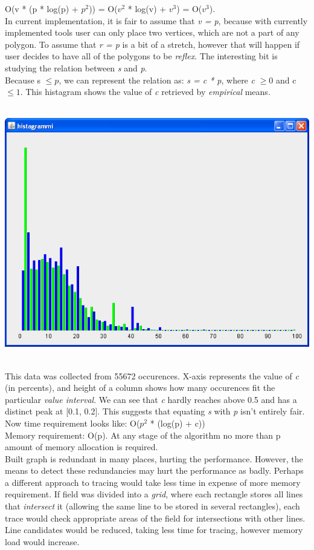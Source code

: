 \documentclass[a4paper,12pt]{article}
\begin{document}
O(v * (p * log(p) + $p^{2}$)) = O($v^{2}$ * log(v) + $v^{3}$) = O($v^{3}$).\\
In current implementation, it is fair to assume that \emph{v = p}, because with currently implemented tools user can only place two vertices, which are not a part of any polygon. To assume that \emph{r = p} is a bit of a stretch, however that will happen if user decides to have all of the polygons to be \emph{reflex}. The interesting bit is studying the relation between \emph{s} and \emph{p}.\\
Because s $\leq{p}$, we can represent the relation as: \emph{s = c * p}, where \emph{c} $\geq{0}$ and c $\leq{1}$. This histagram shows the value of \emph{c} retrieved by \emph{empirical} means.\\ \\
\centerline{\includegraphics[scale=0.5]{histagram.png}} \hspace*{\fill} \\
This data was collected from 55672 occurences. X-axis represents the value of \emph{c} (in percents), and height of a column shows how many occurences fit the particular \emph{value interval}. We can see that \emph{c} hardly reaches above 0.5 and has a distinct peak at [0.1, 0.2]. This suggests that equating \emph{s} with \emph{p} isn't entirely fair. Now time requirement looks like: O($p^{2}$ * (log(p) + c))\\
Memory requirement: O(p). At any stage of the algorithm no more than p amount of memory allocation is required.\\
Built graph is redundant in many places, hurting the performance. However, the means to detect these redundancies may hurt the performance as badly. Perhaps a different approach to tracing would take less time in expense of more memory requirement. If field was divided into a \emph{grid}, where each rectangle stores all lines that \emph{intersect} it (allowing the same line to be stored in several rectangles), each trace would check appropriate areas of the field for intersections with other lines. Line candidates would be reduced, taking less time for tracing, however memory load would increase.
\end{document}
